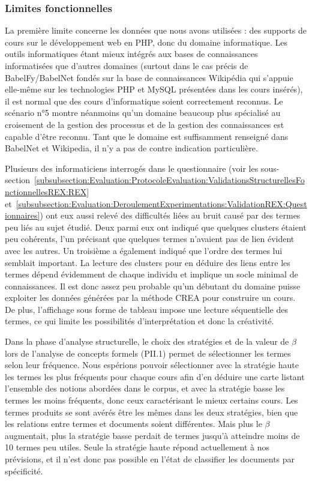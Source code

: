 \subsubsection{Limites fonctionnelles}
\label{subsubsection:Evaluation:Discussions:LimitesMethode:LimitesFonctionnelles}

La première limite concerne les données que nous avons utilisées : des supports de cours sur le développement web en PHP, donc du domaine informatique.
Les outils informatiques étant mieux intégrés aux bases de connaissances informatisées que d'autres domaines (surtout dans le cas précis de BabelFy/BabelNet fondés sur la base de connaissances Wikipédia qui s'appuie elle-même sur les technologies PHP et MySQL présentées dans les cours insérés), il est normal que des cours d'informatique soient correctement reconnus.
Le scénario n°5 montre néanmoins qu'un domaine beaucoup plus spécialisé au croisement de la gestion des processus et de la gestion des connaissances est capable d'être reconnu.
Tant que le domaine est suffisamment renseigné dans BabelNet et Wikipedia, il n'y a pas de contre indication particulière.

\bigskip

Plusieurs des informaticiens interrogés dans le questionnaire (voir les sous-section~\ref{subsubsection:Evaluation:ProtocoleEvaluation:ValidationsStructurellesFonctionnellesREX:REX} et~\ref{subsubsection:Evaluation:DeroulementExperimentations:ValidationREX:Questionnaires}) ont eux aussi relevé des difficultés liées au bruit causé par des termes peu liés au sujet étudié.
Deux parmi eux ont indiqué que quelques clusters étaient peu cohérents, l'un précisant que quelques termes n'avaient pas de lien évident avec les autres.
Un troisième a également indiqué que l'ordre des termes lui semblait important.
La lecture des clusters pour en déduire des liens entre les termes dépend évidemment de chaque individu et implique un socle minimal de connaissances.
Il est donc assez peu probable qu'un débutant du domaine puisse exploiter les données générées par la méthode CREA pour construire un cours.
De plus, l'affichage sous forme de tableau impose une lecture séquentielle des termes, ce qui limite les possibilités d'interprétation et donc la créativité.

\bigskip

Dans la phase d'analyse structurelle, le choix des stratégies et de la valeur de $ \beta $ lors de l'analyse de concepts formels (PII.1) permet de sélectionner les termes selon leur fréquence.
Nous espérions pouvoir sélectionner avec la stratégie haute les termes les plus fréquents pour chaque cours afin d'en déduire une carte listant l'ensemble des notions abordées dans le corpus, et avec la stratégie basse les termes les moins fréquents, donc ceux caractérisant le mieux certains cours.
Les termes produits se sont avérés être les mêmes dans les deux stratégies, bien que les relations entre termes et documents soient différentes.
Mais plus le $ \beta $ augmentait, plus la stratégie basse perdait de termes jusqu'à atteindre moins de 10 termes peu utiles.
Seule la stratégie haute répond actuellement à nos prévisions, et il n'est donc pas possible en l'état de classifier les documents par spécificité.

